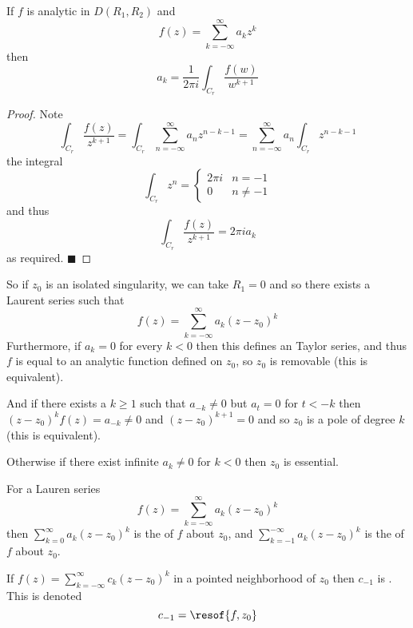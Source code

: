 \documentclass[10pt]{article}
\def\qed{\hskip1cm\hbox{}\hfill$\blacksquare$}
\begin{document}
\begin{prop*}

    If $f$ is analytic in $D(R_1,R_2)$ and
    \[ f(z) = \sum_{k=-\infty}^\infty a_kz^k \]
    then
    \[ a_k = \frac1{2\pi i}\int_{C_r}\frac{f(w)}{w^{k+1}} \]

\end{prop*}

\begin{proof}

    Note
    \[ \int_{C_r}\frac{f(z)}{z^{k+1}} = \int_{C_r}\sum_{n=-\infty}^\infty a_nz^{n-k-1} = \sum_{n=-\infty}^\infty a_n\int_{C_r}z^{n-k-1} \]
    the integral
    \[ \int_{C_r}z^n = \begin{cases} 2\pi i & n=-1 \\ 0 & n\neq-1 \end{cases} \]
    and thus
    \[ \int_{C_r}\frac{f(z)}{z^{k+1}} = 2\pi i a_k \]
    as required.
    \qed

\end{proof}

So if $z_0$ is an isolated singularity, we can take $R_1=0$ and so there exists a Laurent series such that
\[ f(z) = \sum_{k=-\infty}^\infty a_k(z-z_0)^k \]
Furthermore, if $a_k=0$ for every $k<0$ then this defines an Taylor series, and thus $f$ is equal to an analytic function defined on $z_0$, so $z_0$ is removable (this is equivalent).

And if there exists a $k\geq1$ such that $a_{-k}\neq0$ but $a_t=0$ for $t<-k$ then $(z-z_0)^k f(z)=a_{-k}\neq0$ and $(z-z_0)^{k+1}=0$ and so $z_0$ is a pole of degree $k$ (this is equivalent).

Otherwise if there exist infinite $a_k\neq0$ for $k<0$ then $z_0$ is essential.

\begin{defn*}

    For a Lauren series
    \[ f(z) = \sum_{k=-\infty}^\infty a_k(z-z_0)^k \]
    then $\sum_{k=0}^\infty a_k(z-z_0)^k$ is the  of $f$ about $z_0$, and $\sum_{k=-1}^{-\infty}a_k(z-z_0)^k$ is the  of $f$ about $z_0$.

\end{defn*}

\begin{defn*}

    If $f(z)=\sum_{k=-\infty}^\infty c_k(z-z_0)^k$ in a pointed neighborhood of $z_0$ then $c_{-1}$ is .
    This is denoted
    \[ c_{-1} = \resof{f,z_0} \]

\end{defn*}
\end{document}
